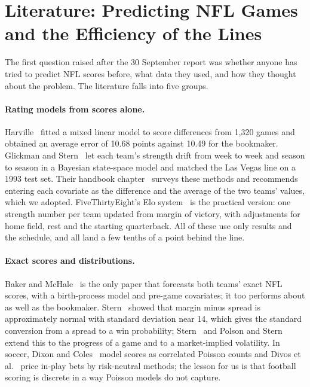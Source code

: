 \section{Literature: Predicting NFL Games and the Efficiency of the Lines}\label{sec:literature}

The first question raised after the 30 September report was whether anyone has tried to predict NFL scores before, what data they used, and how they thought about the problem. The literature falls into five groups.

\paragraph{Rating models from scores alone.} Harville~\cite{harville1980} fitted a mixed linear model to score differences from 1,320 games and obtained an average error of 10.68 points against 10.49 for the bookmaker. Glickman and Stern~\cite{glickmanstern1998} let each team's strength drift from week to week and season to season in a Bayesian state-space model and matched the Las Vegas line on a 1993 test set. Their handbook chapter~\cite{glickmanstern2017} surveys these methods and recommends entering each covariate as the difference and the average of the two teams' values, which we adopted. FiveThirtyEight's Elo system~\cite{fivethirtyeightelo} is the practical version: one strength number per team updated from margin of victory, with adjustments for home field, rest and the starting quarterback. All of these use only results and the schedule, and all land a few tenths of a point behind the line.

\paragraph{Exact scores and distributions.} Baker and McHale~\cite{bakermchale2013} is the only paper that forecasts both teams' exact NFL scores, with a birth-process model and pre-game covariates; it too performs about as well as the bookmaker. Stern~\cite{stern1991} showed that margin minus spread is approximately normal with standard deviation near 14, which gives the standard conversion from a spread to a win probability; Stern~\cite{stern1994} and Polson and Stern~\cite{polsonstern2015} extend this to the progress of a game and to a market-implied volatility. In soccer, Dixon and Coles~\cite{dixoncoles1997} model scores as correlated Poisson counts and Divos et al.~\cite{divos2018} price in-play bets by risk-neutral methods; the lesson for us is that football scoring is discrete in a way Poisson models do not capture.

